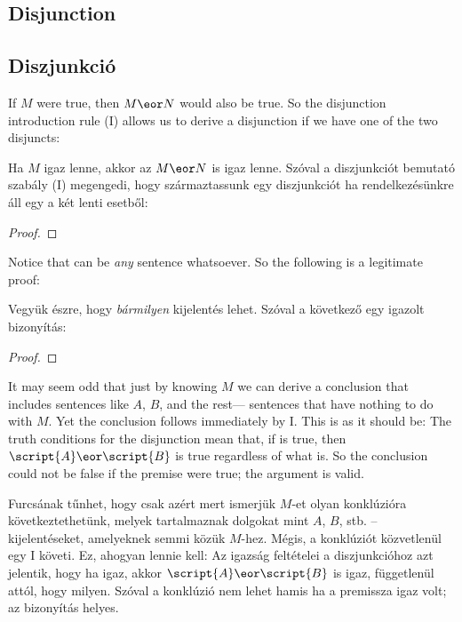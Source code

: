 \subsection*{Disjunction}
\subsection{Diszjunkció}
If $M$ were true, then $M \eor N$ would also be true. So the disjunction introduction rule ({\eor}I) allows us to derive a disjunction if we have one of the two disjuncts:

Ha $M$ igaz lenne, akkor az $M \eor N$ is igaz lenne. Szóval a diszjunkciót bemutató szabály ({\eor}I) megengedi, hogy származtassunk egy diszjunkciót ha rendelkezésünkre áll egy a két lenti esetből:

\begin{proof}
\end{proof}

Notice that  can be \emph{any} sentence whatsoever. So the following is a legitimate proof:

Vegyük észre, hogy  \emph{bármilyen} kijelentés lehet. Szóval a következő egy igazolt bizonyítás:

\begin{proof}
\end{proof}

It may seem odd that just by knowing $M$ we can derive a conclusion that includes sentences like $A$, $B$, and the rest--- sentences that have nothing to do with $M$. Yet the conclusion follows immediately by {\eor}I. This is as it should be: The truth conditions for the disjunction mean that, if  is true, then $\script{A}\eor \script{B}$ is true regardless of what  is. So the conclusion could not be false if the premise were true; the argument is valid.

Furcsának tűnhet, hogy csak azért mert ismerjük $M$-et olyan konklúzióra következtethetünk, melyek tartalmaznak dolgokat mint $A$, $B$, stb. -- kijelentéseket, amelyeknek semmi közük $M$-hez. Mégis, a konklúziót közvetlenül egy {\eor}I követi. Ez, ahogyan lennie kell: Az igazság feltételei a diszjunkcióhoz azt jelentik, hogy ha  igaz, akkor $\script{A}\eor \script{B}$ is igaz, függetlenül attól, hogy  milyen. Szóval a konklúzió nem lehet hamis ha a premissza igaz volt; az bizonyítás helyes.


